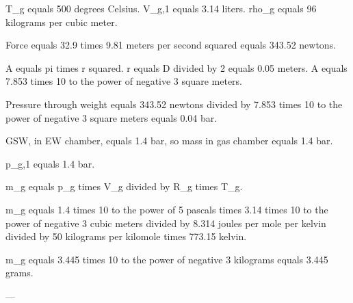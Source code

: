 T_g equals 500 degrees Celsius.  
V_g,1 equals 3.14 liters.  
rho_g equals 96 kilograms per cubic meter.  

Force equals 32.9 times 9.81 meters per second squared equals 343.52 newtons.  

A equals pi times r squared. r equals D divided by 2 equals 0.05 meters.  
A equals 7.853 times 10 to the power of negative 3 square meters.  

Pressure through weight equals 343.52 newtons divided by 7.853 times 10 to the power of negative 3 square meters equals 0.04 bar.  

GSW, in EW chamber, equals 1.4 bar, so mass in gas chamber equals 1.4 bar.  

p_g,1 equals 1.4 bar.  

m_g equals p_g times V_g divided by R_g times T_g.  

m_g equals 1.4 times 10 to the power of 5 pascals times 3.14 times 10 to the power of negative 3 cubic meters divided by 8.314 joules per mole per kelvin divided by 50 kilograms per kilomole times 773.15 kelvin.  

m_g equals 3.445 times 10 to the power of negative 3 kilograms equals 3.445 grams.  

---